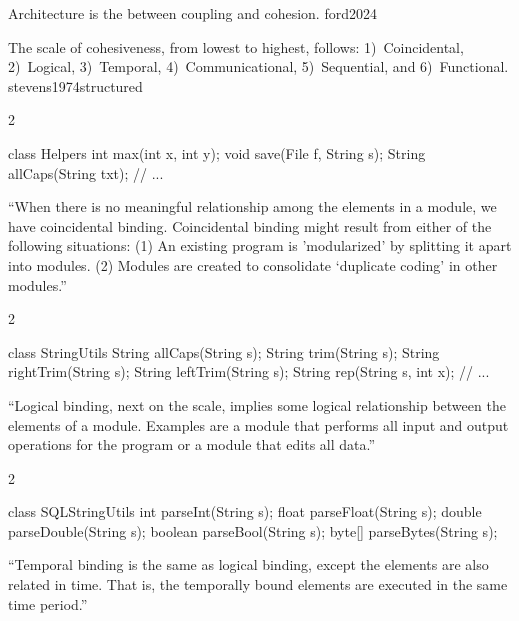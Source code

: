 \documentclass{article}
\begin{document}
  {Architecture is the  between coupling and cohesion.}
  {ford2024}


  {The scale of cohesiveness, from lowest to highest, follows:
    1)~Coincidental,
    2)~Logical,
    3)~Temporal,
    4)~Communicational,
    5)~Sequential,
    and
    6)~Functional.}
  {stevens1974structured}

\begin{multicols}{2}
{\small\begin{ffcode}
class Helpers {
  int max(int x, int y);
  void save(File f, String s);
  String allCaps(String txt);
  // ...
}
\end{ffcode}
}
\par\columnbreak\par
``When there is no meaningful relationship among the elements in a module, we have coincidental binding. Coincidental binding
might result from either of the following situations: (1) An existing program is 'modularized' by splitting it apart into modules. (2) Modules are created to consolidate `duplicate coding' in other modules.''
\end{multicols}
\plush{}

\begin{multicols}{2}
{\small\begin{ffcode}
class StringUtils {
  String allCaps(String s);
  String trim(String s);
  String rightTrim(String s);
  String leftTrim(String s);
  String rep(String s, int x);
  // ...
}
\end{ffcode}
}
\par\columnbreak\par
``Logical binding, next on the scale, implies some logical relationship between the elements of a module. Examples are a module that performs all input and output operations for the program or a module that edits all data.''
\end{multicols}
\plush{}

\begin{multicols}{2}
{\small\begin{ffcode}
class SQLStringUtils {
  int parseInt(String s);
  float parseFloat(String s);
  double parseDouble(String s);
  boolean parseBool(String s);
  byte[] parseBytes(String s);
}
\end{ffcode}
}
\par\columnbreak\par
``Temporal binding is the same as logical binding, except the elements are also related in time. That is, the temporally bound elements are executed in the same time period.''
\end{multicols}
\plush{}
\end{document}
